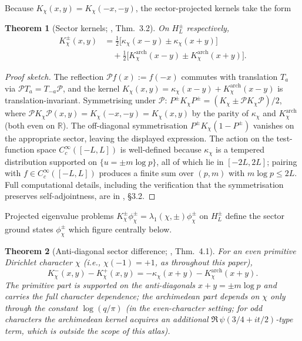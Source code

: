 \documentclass[a4paper,10pt,twocolumn]{article}
\newtheorem{theorem}{Theorem}[section]
\theoremstyle{definition}
\theoremstyle{remark}
\newcommand{\chifn}{\chi}
\begin{document}
Because $K_{\chifn}(x,y)=K_{\chifn}(-x,-y)$, the sector-projected
kernels take the form
\begin{theorem}[Sector kernels; {\cite{AnalyticKernel}, Thm.~3.2}]
\label{thm:kernel}
On $H_L^\pm$ respectively,
\[
\begin{aligned}
  K_{\chifn}^{\pm}(x,y)
    &=\tfrac{1}{2}\bigl[\kappa_{\chifn}(x-y)
       \pm\kappa_{\chifn}(x+y)\bigr]\\
    &\quad+\tfrac{1}{2}\bigl[K^{\mathrm{arch}}_{\chifn}(x-y)
       \pm K^{\mathrm{arch}}_{\chifn}(x+y)\bigr].
\end{aligned}
\]
\end{theorem}

\begin{proof}[Proof sketch]
The reflection $\mathcal{P}f(x):=f(-x)$ commutes with translation
$T_a$ via $\mathcal{P}T_a=T_{-a}\mathcal{P}$, and the kernel
$K_\chi(x,y)=\kappa_\chi(x-y)+K^{\mathrm{arch}}_\chi(x-y)$ is
translation-invariant. Symmetrising under $\mathcal{P}$:
$P^\pm K_\chi P^\pm=(K_\chi\pm\mathcal{P}K_\chi\mathcal{P})/2$,
where $\mathcal{P}K_\chi\mathcal{P}(x,y)=K_\chi(-x,-y)=K_\chi(x,y)$
by the parity of $\kappa_\chi$ and $K^{\mathrm{arch}}_\chi$ (both
even on $\mathbb{R}$). The off-diagonal symmetrisation
$P^\pm K_\chi(1-P^\pm)$ vanishes on the appropriate sector, leaving
the displayed expression. The action on the test-function space
$C_c^\infty([-L,L])$ is well-defined because $\kappa_\chi$ is a
tempered distribution supported on $\{u=\pm m\log p\}$, all of which
lie in $[-2L,2L]$; pairing with $f\in C_c^\infty([-L,L])$ produces a
finite sum over $(p,m)$ with $m\log p\leq 2L$. Full computational
details, including the verification that the symmetrisation
preserves self-adjointness, are in \cite{AnalyticKernel}, \S3.2.
\end{proof}

Projected eigenvalue problems
$K_{\chifn}^{\pm}\phi_{\chifn}^{\pm}=\lambda_1(\chifn,\pm)\phi_{\chifn}^{\pm}$
on $H_L^\pm$ define the sector ground states $\phi_{\chifn}^\pm$
which figure centrally below.

\begin{theorem}[Anti-diagonal sector difference; {\cite{AnalyticKernel}, Thm.~4.1}]
\label{thm:sector-diff}
For an even primitive Dirichlet character $\chifn$ (i.e.,
$\chifn(-1)=+1$, as throughout this paper),
\[
  K_{\chifn}^-(x,y)-K_{\chifn}^+(x,y)
    =-\kappa_{\chifn}(x+y)-K^{\mathrm{arch}}_{\chifn}(x+y).
\]
The primitive part is supported on the anti-diagonals $x+y=\pm m\log
p$ and carries the full character dependence; the archimedean part
depends on $\chifn$ only through the constant $\log(q/\pi)$ (in the
even-character setting; for odd characters the archimedean kernel
acquires an additional $\Re\,\psi(3/4+it/2)$-type term, which is
outside the scope of this atlas).
\end{theorem}
\end{document}
